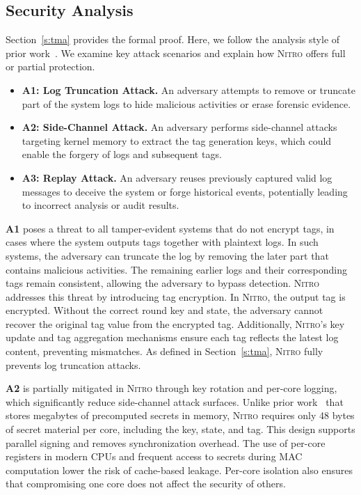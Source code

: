 \documentclass[sigconf]{sty/acmart}
\newcommand{\Sys}{\mbox{\textsc{Nitro}}\xspace}
\newcommand{\tamperevident}{tamper-evident\xspace}
\begin{document}
\subsection{Security Analysis}
Section~\ref{s:tma} provides the formal proof. Here, we follow the analysis style of prior work~\cite{kennylog}.
We examine key attack scenarios and explain how \Sys offers full or partial protection.

\begin{itemize}[leftmargin=*]
\item \textbf{A1: Log Truncation Attack.} An adversary attempts to remove or truncate part of the system logs to hide malicious activities or erase forensic evidence.
\item \textbf{A2: Side-Channel Attack.} An adversary performs side-channel attacks targeting kernel memory to extract the tag generation keys, which could enable the forgery of logs and subsequent tags.
\item \textbf{A3: Replay Attack.} An adversary reuses previously captured valid log messages to deceive the system or forge historical events, potentially leading to incorrect analysis or audit results.
\end{itemize}

{\bf A1} poses a threat to all \tamperevident systems that do not encrypt tags, in cases where the system outputs tags together with plaintext logs. In such systems, the adversary can truncate the log by removing the later part that contains malicious activities. The remaining earlier logs and their corresponding tags remain consistent, allowing the adversary to bypass detection.
\Sys addresses this threat by introducing tag encryption. In \Sys, the output tag is encrypted. Without the correct round key and state, the adversary cannot recover the original tag value from the encrypted tag. Additionally, \Sys's key update and tag aggregation mechanisms ensure each tag reflects the latest log content, preventing mismatches. As defined in Section~\ref{s:tma}, \Sys fully prevents log truncation attacks.

{\bf A2} is partially mitigated in \Sys through key rotation and per-core logging, which significantly reduce side-channel attack surfaces. Unlike prior work~\cite{kennylog} that stores megabytes of precomputed secrets in memory, \Sys requires only 48 bytes of secret material per core, including the key, state, and tag. This design supports parallel signing and removes synchronization overhead. The use of per-core registers in modern CPUs and frequent access to secrets during MAC computation lower the risk of cache-based leakage. Per-core isolation also ensures that compromising one core does not affect the security of others.
\end{document}
